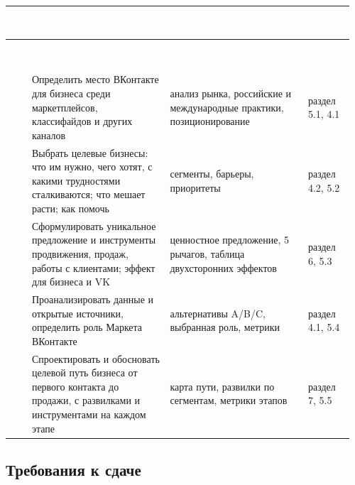 \documentclass[10pt,a4paper]{article}
\begin{document}
\begingroup
\small
\setlength{\tabcolsep}{3pt}
\renewcommand{\arraystretch}{1.12}
\begin{longtable}{@{}>{\raggedright\arraybackslash}p{0.0347\linewidth}>{\raggedright\arraybackslash}p{0.3991\linewidth}>{\raggedright\arraybackslash}p{0.3991\linewidth}>{\raggedright\arraybackslash}p{0.1301\linewidth}@{}}
\rowcolor{blue}
\textcolor{white}{\textbf{№}} & \textcolor{white}{\textbf{Задача}} & \textcolor{white}{\textbf{Что должно быть в ответе}} & \textcolor{white}{\textbf{Где в отчёте}} \\
\endfirsthead
\rowcolor{blue}
\textcolor{white}{\textbf{№}} & \textcolor{white}{\textbf{Задача}} & \textcolor{white}{\textbf{Что должно быть в ответе}} & \textcolor{white}{\textbf{Где в отчёте}} \\
\endhead
\hline
1 & Определить место ВКонтакте для бизнеса среди маркетплейсов, классифайдов и других каналов & анализ рынка, российские и международные практики, позиционирование & раздел 5.1, 4.1 \\
2 & Выбрать целевые бизнесы: что им нужно, чего хотят, с какими трудностями сталкиваются; что мешает расти; как помочь & сегменты, барьеры, приоритеты & раздел 4.2, 5.2 \\
3 & Сформулировать уникальное предложение и инструменты продвижения, продаж, работы с клиентами; эффект для бизнеса и VK & ценностное предложение, 5 рычагов, таблица двухсторонних эффектов & раздел 6, 5.3 \\
4 & Проанализировать данные и открытые источники, определить роль Маркета ВКонтакте & альтернативы A/B/C, выбранная роль, метрики & раздел 4.1, 5.4 \\
5 & Спроектировать и обосновать целевой путь бизнеса от первого контакта до продажи, с развилками и инструментами на каждом этапе & карта пути, развилки по сегментам, метрики этапов & раздел 7, 5.5 \\
\hline
\end{longtable}
\endgroup
\vspace{4pt}

\subsection{Требования к сдаче}
\end{document}
